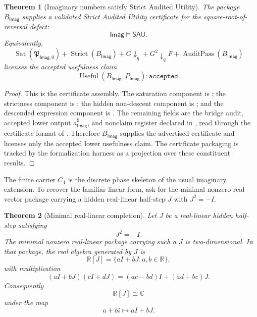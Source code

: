 \documentclass[11pt]{article}
\newcommand{\Imag}{\mathsf{Imag}}
\newtheorem{theorem}{Theorem}[section]
\theoremstyle{definition}
\begin{document}
\begin{theorem}[Imaginary numbers satisfy Strict Audited Utility]
\label{thm:imag-sau-certificate}
The package \(B_{\Imag}\) supplies a validated Strict Audited Utility certificate for the square-root-of-reversal defect:
\[
\mathsf{Imag}\models \mathsf{SAU}.
\]
Equivalently,
\[
\operatorname{Sat}(\mathfrak P_{\Imag,0})
+
\operatorname{Strict}(B_{\Imag})
+
G\not\downarrow_q
+
G^2\downarrow_q F
+
\operatorname{AuditPass}(B_{\Imag})
\]
licenses the accepted usefulness claim
\[
\operatorname{Useful}(B_{\Imag},P_{\Imag}):\texttt{accepted}.
\]
\end{theorem}

\begin{proof}
This is the certificate assembly.  The saturation component is
; the strictness component is
; the hidden non-descent component is
; and the descended expression component is
.  The remaining fields are the bridge audit,
accepted lower output \(a^\sharp_{\Imag}\), and nonclaim register declared in
, read through the certificate format of
.  Therefore \(B_{\Imag}\) supplies the advertised certificate
and licenses only the accepted lower usefulness claim.  The certificate
packaging is tracked by the formalization harness as a projection over these
constituent results.
\end{proof}

The finite carrier \(C_4\) is the discrete phase skeleton of the usual
imaginary extension.  To recover the familiar linear form, ask for the minimal
nonzero real vector package carrying a hidden real-linear half-step \(J\) with
\(J^2=-I\).

\begin{theorem}[Minimal real-linear completion]
\label{thm:imag-minimal-real-linear-completion}
Let \(J\) be a real-linear hidden half-step satisfying
\[
J^2=-I.
\]
The minimal nonzero real-linear package carrying such a \(J\) is two-dimensional.  In that package, the real algebra generated by \(J\) is
\[
\mathbb R[J]=\{aI+bJ:a,b\in\mathbb R\},
\]
with multiplication
\[
(aI+bJ)(cI+dJ)=(ac-bd)I+(ad+bc)J.
\]
Consequently
\[
\mathbb R[J]\cong \mathbb C
\]
under the map
\[
a+bi\longmapsto aI+bJ.
\]
\end{theorem}
\end{document}
